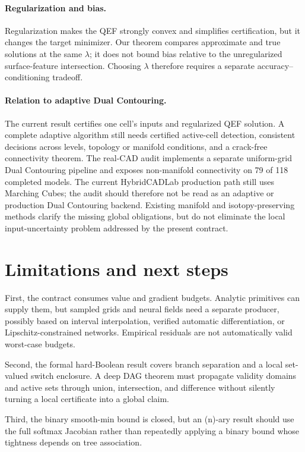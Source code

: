 \documentclass[11pt]{article}
\theoremstyle{definition}
\begin{document}
\paragraph{Regularization and bias.}
Regularization makes the QEF strongly convex and simplifies certification, but
it changes the target minimizer.  Our theorem compares approximate and true
solutions at the same \(\lambda\); it does not bound bias relative to the
unregularized surface-feature intersection.  Choosing \(\lambda\) therefore
requires a separate accuracy--conditioning tradeoff.

\paragraph{Relation to adaptive Dual Contouring.}
The current result certifies one cell's inputs and regularized QEF solution.  A
complete adaptive algorithm still needs certified active-cell detection,
consistent decisions across levels, topology or manifold conditions, and a
crack-free connectivity theorem.  The real-CAD audit implements a separate
uniform-grid Dual Contouring pipeline and exposes non-manifold connectivity on
79 of 118 completed models.  The current HybridCADLab production path still
uses Marching Cubes; the audit should therefore not be read as an adaptive or
production Dual Contouring backend.
Existing manifold and isotopy-preserving methods
\cite{schaefer2007manifold,plantinga2004isotopic} clarify the missing global
obligations, but do not eliminate the local input-uncertainty problem addressed
by the present contract.

\section{Limitations and next steps}

First, the contract consumes value and gradient budgets.  Analytic primitives
can supply them, but sampled grids and neural fields need a separate producer,
possibly based on interval interpolation, verified automatic differentiation,
or Lipschitz-constrained networks.  Empirical residuals are not automatically
valid worst-case budgets.

Second, the formal hard-Boolean result covers branch separation and a local
set-valued switch enclosure.  A deep DAG theorem must propagate validity
domains and active sets through union, intersection, and difference without
silently turning a local certificate into a global claim.

Third, the binary smooth-min bound is closed, but an (n)-ary result should use
the full softmax Jacobian rather than repeatedly applying a binary bound whose
tightness depends on tree association.
\end{document}
